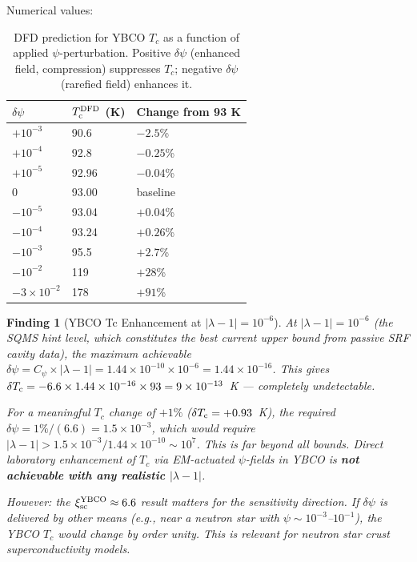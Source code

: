 \documentclass[11pt]{article}
\newtheorem{finding}{Finding}
\newcommand{\ee}[1]{\times 10^{#1}}
\newcommand{\Tc}{T_{\rm c}}
\begin{document}
Numerical values:
\begin{table}[h]
\centering
\caption{DFD prediction for YBCO $T_c$ as a function of applied $\psi$-perturbation.
Positive $\delta\psi$ (enhanced field, compression) suppresses $T_c$;
negative $\delta\psi$ (rarefied field) enhances it.}
\label{tab:YBCO-Tc}
\begin{tabular}{lll}
\toprule
$\delta\psi$ & $\Tc^{\rm DFD}$ (K) & Change from 93 K \\
\midrule
$+10^{-3}$ & 90.6 & $-2.5$\% \\
$+10^{-4}$ & 92.8 & $-0.25$\% \\
$+10^{-5}$ & 92.96 & $-0.04$\% \\
$0$ & 93.00 & baseline \\
$-10^{-5}$ & 93.04 & $+0.04$\% \\
$-10^{-4}$ & 93.24 & $+0.26$\% \\
$-10^{-3}$ & 95.5 & $+2.7$\% \\
$-10^{-2}$ & 119 & $+28$\% \\
$-3\times10^{-2}$ & 178 & $+91$\% \\
\bottomrule
\end{tabular}
\end{table}

\begin{finding}[YBCO Tc Enhancement at $|\lambda-1| = 10^{-6}$]
At $|\lambda-1| = 10^{-6}$ (the SQMS hint level, which constitutes the best
current upper bound from passive SRF cavity data), the maximum achievable
$\delta\psi = C_\psi \times |\lambda-1| = 1.44\ee{-10} \times 10^{-6}
= 1.44\ee{-16}$. This gives $\delta\Tc = -6.6 \times 1.44\ee{-16} \times 93
= 9\ee{-13}$~K --- completely undetectable.

For a meaningful $T_c$ change of $+1\%$ ($\delta\Tc = +0.93$~K), the required
$\delta\psi = 1\%/(6.6) = 1.5\ee{-3}$, which would require
$|\lambda-1| > 1.5\ee{-3}/1.44\ee{-10} \sim 10^{7}$. This is far beyond all
bounds. Direct laboratory enhancement of $T_c$ via EM-actuated $\psi$-fields
in YBCO is \textbf{not achievable with any realistic $|\lambda-1|$}.

\emph{However}: the $\xi_{\rm sc}^{\rm YBCO} \approx 6.6$ result matters for the
sensitivity direction. If $\delta\psi$ is delivered by other means
(e.g., near a neutron star with $\psi \sim 10^{-3}$--$10^{-1}$), the YBCO
$T_c$ would change by order unity. This is relevant for neutron star crust
superconductivity models.
\end{finding}
\end{document}
